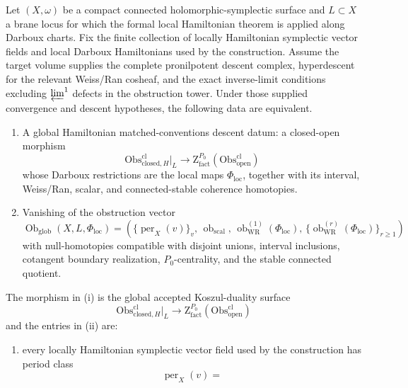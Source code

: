 \begin{thm}\label{thm:global-descent-criterion}
  Let \((X,\omega)\) be a compact connected holomorphic-symplectic
  surface and \(L\subset X\) a brane locus for which the formal local
  Hamiltonian theorem is applied along Darboux charts.  Fix the finite
  collection of locally Hamiltonian symplectic vector fields and local
  Darboux Hamiltonians used by the construction.  Assume the target
  volume supplies the complete pronilpotent descent complex, hyperdescent
  for the relevant Weiss/Ran cosheaf, and the exact inverse-limit
  conditions excluding \(\varprojlim^1\) defects in the obstruction
  tower.  Under those supplied convergence and descent hypotheses, the
  following data are equivalent.
  \begin{enumerate}[label=(\roman*)]
    \item A global Hamiltonian matched-conventions descent datum:
      a closed-open morphism
      \[
        \mathrm{Obs}^{\mathrm{cl}}_{\mathrm{closed},H}\big|_L
          \longrightarrow
        \mathrm Z^{P_0}_{\mathrm{fact}}
          (\mathrm{Obs}^{\mathrm{cl}}_{\mathrm{open}})
      \]
      whose Darboux restrictions are the local maps
      \(\Phi_{\mathrm{loc}}\), together with its interval,
      Weiss/Ran, scalar, and connected-stable coherence homotopies.
    \item Vanishing of the obstruction vector
      \[
      \operatorname{Ob}_{\mathrm{glob}}(X,L,\Phi_{\mathrm{loc}})
      =
      \left(
        \{\operatorname{per}_X(v)\}_v,\,
        \operatorname{ob}_{\mathrm{scal}},\,
        \operatorname{ob}^{(1)}_{\mathrm{WR}}(\Phi_{\mathrm{loc}}),\,
        \{\operatorname{ob}^{(r)}_{\mathrm{WR}}(\Phi_{\mathrm{loc}})\}_{r\ge1}
      \right)
      \]
      with null-homotopies compatible with disjoint unions, interval
      inclusions, cotangent boundary realization, \(P_0\)-centrality, and
      the stable connected quotient.
  \end{enumerate}
  The morphism in (i) is the global accepted Koszul-duality surface
  \[
    \mathrm{Obs}^{\mathrm{cl}}_{\mathrm{closed},H}\big|_L
      \longrightarrow
    \mathrm Z^{P_0}_{\mathrm{fact}}
      (\mathrm{Obs}^{\mathrm{cl}}_{\mathrm{open}})
  \]
  and the entries in (ii) are:
  \begin{enumerate}[label=(\alph*)]
    \item every locally Hamiltonian symplectic vector field used by the
      construction has period class
      \[
        \operatorname{per}_X(v)=
\]
\end{enumerate}
\end{thm}
